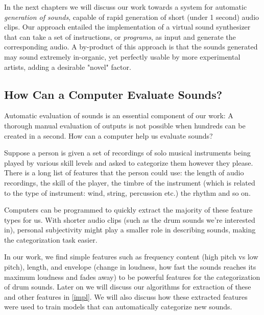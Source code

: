 \documentclass[\main/thesis.tex]{subfiles}
\begin{document}
In the next chapters we will discuss our work towards a system for automatic \textit{generation of sounds}, capable of rapid generation of short (under 1 second) audio clips. Our approach entailed the implementation of a virtual sound synthesizer that can take a set of instructions, or \textit{programs}, as input and generate the corresponding audio. A by-product of this approach is that the sounds generated may sound extremely in-organic, yet perfectly usable by more experimental artists, adding a desirable "novel" factor. 



\subsection{How Can a Computer Evaluate Sounds?}
Automatic evaluation of sounds is an essential component of our work: A thorough manual evaluation of outputs is not possible when hundreds can be created in a second. How can a computer help us evaluate sounds?

Suppose a person is given a set of recordings of solo musical instruments being played by various skill levels and asked to categorize them however they please. There is a long list of features that the person could use: the length of audio recordings, the skill of the player, the timbre of the instrument (which is related to the type of instrument: wind, string, percussion etc.) the rhythm and so on. 

 Computers can be programmed to quickly extract the majority of these feature types for us. With shorter audio clips (such as the drum sounds we're interested in), personal subjectivity might play a smaller role in describing sounds, making the categorization task easier.

In our work, we find simple features such as frequency content (high pitch vs low pitch), length, and envelope (change in loudness, how fast the sounds reaches its maximum loudness and fades away) to be powerful features for the categorization of drum sounds. Later on we will discuss our algorithms for extraction of these and other features in \ref{impl}. We will also discuss how these extracted features were used to train models that can automatically categorize new sounds.  
\end{document}
